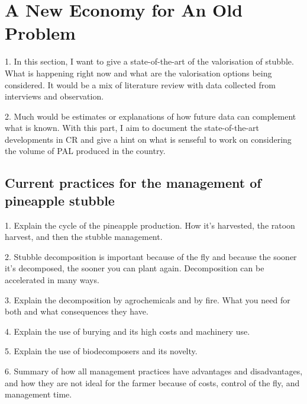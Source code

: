 \chapter{A New Economy for An Old Problem}
\label{neweconomy}

1. In this section, I want to give a state-of-the-art of the valorisation of stubble. What is happening right now and what are the valorisation options being considered. It would be a mix of literature review with data collected from interviews and observation. 

2. Much would be estimates or explanations of how future data can complement what is known. With this part, I aim to document the state-of-the-art developments in CR and give a hint on what is senseful to work on considering the volume of PAL produced in the country.

\section{Current practices for the management of pineapple stubble}

1. Explain the cycle of the pineapple production. How it's harvested, the ratoon harvest, and then the stubble management.

2. Stubble decomposition is important because of the fly and because the sooner it's decomposed, the sooner you can plant again. Decomposition can be accelerated in many ways.

3. Explain the decomposition by agrochemicals and by fire. What you need for both and what consequences they have.

4. Explain the use of burying and its high costs and machinery use.

5. Explain the use of biodecomposers and its novelty. 

6. Summary of how all management practices have advantages and disadvantages, and how they are not ideal for the farmer because of costs, control of the fly, and management time.

